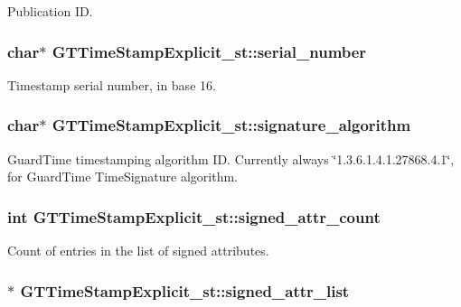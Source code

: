 \label{struct_g_t_time_stamp_explicit__st_a99428914cd47f90062a204f6578abcd5}
Publication ID. \hypertarget{struct_g_t_time_stamp_explicit__st_a32990948ebbc27a388028288f5bcfc1c}{
\subsubsection[{serial\_\-number}]{\setlength{\rightskip}{0pt plus 5cm}char$\ast$ {\bf GTTimeStampExplicit\_\-st::serial\_\-number}}}
\label{struct_g_t_time_stamp_explicit__st_a32990948ebbc27a388028288f5bcfc1c}
Timestamp serial number, in base 16. \hypertarget{struct_g_t_time_stamp_explicit__st_a451e9a914910c7f64533558276b2e601}{
\subsubsection[{signature\_\-algorithm}]{\setlength{\rightskip}{0pt plus 5cm}char$\ast$ {\bf GTTimeStampExplicit\_\-st::signature\_\-algorithm}}}
\label{struct_g_t_time_stamp_explicit__st_a451e9a914910c7f64533558276b2e601}
GuardTime timestamping algorithm ID. Currently always \char`\"{}1.3.6.1.4.1.27868.4.1\char`\"{}, for GuardTime TimeSignature algorithm. \hypertarget{struct_g_t_time_stamp_explicit__st_a7fc4a621668932cbdf55171908604683}{
\subsubsection[{signed\_\-attr\_\-count}]{\setlength{\rightskip}{0pt plus 5cm}int {\bf GTTimeStampExplicit\_\-st::signed\_\-attr\_\-count}}}
\label{struct_g_t_time_stamp_explicit__st_a7fc4a621668932cbdf55171908604683}
Count of entries in the list of signed attributes. \hypertarget{struct_g_t_time_stamp_explicit__st_aa0655469149117409308f6f4fb361c94}{
\subsubsection[{signed\_\-attr\_\-list}]{$\ast$ {\bf GTTimeStampExplicit\_\-st::signed\_\-attr\_\-list}}}
